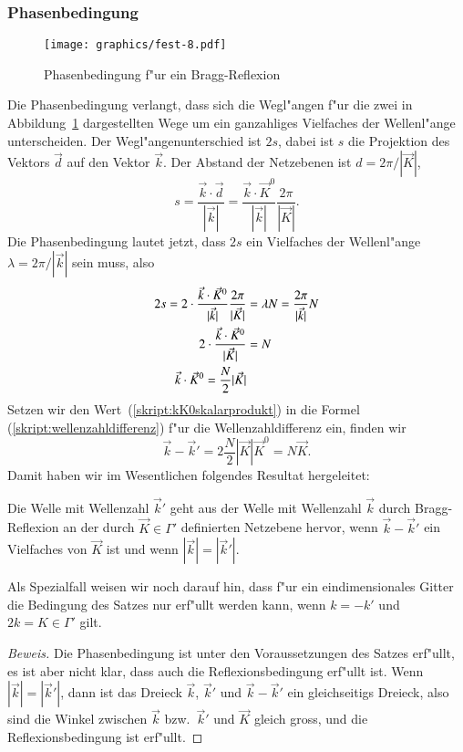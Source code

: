 \subsubsection{Phasenbedingung}
%
\begin{figure}
\centering
\texttt{[image: graphics/fest-8.pdf]}
\caption{Phasenbedingung f"ur ein Bragg-Reflexion
\label{skript:phasenbedingung}}
\end{figure}
Die Phasenbedingung verlangt, dass sich die Wegl"angen f"ur die zwei in
Abbildung~\ref{skript:phasenbedingung} dargestellten Wege um ein
ganzahliges Vielfaches der Wellenl"ange unterscheiden.
Der Wegl"angenunterschied ist $2s$, dabei ist $s$ die Projektion des
Vektors $\vec d$ auf den Vektor $\vec k$. Der Abstand der Netzebenen
ist $d=2\pi / |\vec K|$,
\[
s
=
\frac{\vec k\cdot \vec d}{|\vec k|}
=
\frac{\vec k\cdot \vec K^0}{|\vec k|}\frac{2\pi}{|\vec K|}.
\]
Die Phasenbedingung lautet jetzt, dass $2s$ ein Vielfaches der Wellenl"ange
$\lambda = 2\pi/|\vec k|$ sein muss, also
\begin{align}
2s
=
2\cdot \frac{\vec k\cdot \vec K^0}{|\vec k|}\frac{2\pi}{|\vec K|}
&=
\lambda N
=
\frac{2\pi}{|\vec k|} N
\notag
\\
2\cdot \frac{\vec k\cdot \vec K^0}{|\vec K|}
&=
N
\notag
\\
\vec k\cdot \vec K^0=\frac{N}2 |\vec K|
\label{skript:kK0skalarprodukt}
\end{align}
Setzen wir den Wert~(\ref{skript:kK0skalarprodukt}) in die Formel
(\ref{skript:wellenzahldifferenz})
f"ur die Wellenzahldifferenz ein, finden wir
\[
\vec k-\vec k'=2 \frac{N}2 |\vec K|\vec K^0=N\vec K.
\]
Damit haben wir im Wesentlichen folgendes Resultat hergeleitet:
\begin{satz}
\label{skript:braggsatz}
Die Welle mit Wellenzahl $\vec k'$ geht aus der Welle mit Wellenzahl
$\vec k$ durch
Bragg-Reflexion an der durch $\vec K\in\Gamma'$ definierten Netzebene
hervor, wenn $\vec k-\vec k'$ ein Vielfaches von $\vec K$ ist und
wenn $|\vec k|=|\vec k'|$.
\end{satz}

Als Spezialfall weisen wir noch darauf hin, dass f"ur ein eindimensionales
Gitter die Bedingung des Satzes nur erf"ullt werden kann, wenn
$k=-k'$ und $2k=K\in\Gamma'$ gilt.

\begin{proof}[Beweis]
Die Phasenbedingung ist unter den Voraussetzungen des Satzes erf"ullt,
es ist aber nicht klar, dass auch die Reflexionsbedingung erf"ullt ist.
Wenn $|\vec k|=|\vec k'|$, dann ist das Dreieck $\vec k$, $\vec k'$
und $\vec k- \vec k'$ ein gleichseitigs Dreieck, also sind die Winkel
zwischen $\vec k$ bzw.~$\vec k'$ und $\vec K$ gleich gross, und die
Reflexionsbedingung ist erf"ullt.
\end{proof}

